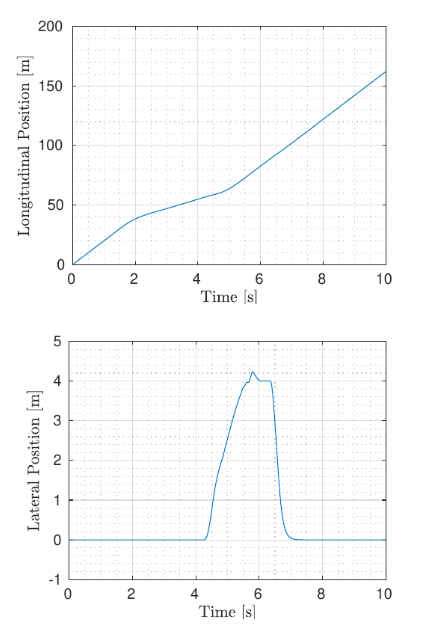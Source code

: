 \begin{figure}[!h] %
	\begin{minipage}[t]{0.5\textwidth}
		\includegraphics[width=\textwidth]{./figure/three_obstacles_no_overtaking/LongitudinalPositionVsTime.pdf}
		\subcaption{}\label{fig:longitudinal_braking}
	\end{minipage}
	\begin{minipage}[t]{0.5\textwidth}
		\includegraphics[width=\textwidth]{./figure/three_obstacles_no_overtaking/LateralPositionVsTime.pdf}
		\subcaption{}\label{fig:lateral_braking}
	\end{minipage}
	\begin{minipage}[t]{0.5\textwidth}

\end{minipage}
\end{figure}
